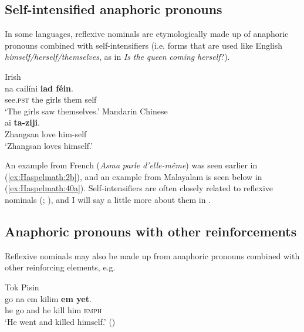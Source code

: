 \documentclass[output=paper]{langscibook}
\begin{document}
\subsection{Self-intensified anaphoric pronouns}\label{sec:Haspelmath:6.3}

In some languages, reflexive nominals are etymologically made up of anaphoric pronouns combined with self-intensifiers (i.e. forms that are used like English \textit{himself/herself/themselves}, as in \textit{Is} \textit{the} \textit{queen} \textit{coming} \textit{herself}?).

\ea%
    \label{ex:Haspelmath:26}
    \ea  Irish\label{ex:Haspelmath:26a}\\
      {na}  {cailíni}  \textbf{{iad}  {féin}}.  \\
      see.\textsc{pst}  the  girls  them  self  \\
    \glt ‘The girls saw themselves.’ \citep[36]{Nolan2000}
    \ex Mandarin Chinese  \label{ex:Haspelmath:26b}\\
       {ai}  \textbf{{ta-ziji}}. \\
        Zhangsan  love  him-self \\
    \glt‘Zhangsan loves himself.’ \citep[98]{Tang1989}
    \z
\z 

An example from French (\textit{Asma} \textit{parle} \textit{d’elle-même}) was seen earlier in (\ref{ex:Haspelmath:2b}), and an example from Malayalam is seen below in (\ref{ex:Haspelmath:40a}). Self-intensifiers are often closely related to reflexive nominals (\citealt{KoenigSiemund1999}; \citealt{KoenigEtAl2005}), and I will say a little more about them in .


\subsection{Anaphoric pronouns with other reinforcements}\label{sec:Haspelmath:6.4}

Reflexive nominals may also be made up from anaphoric pronouns combined with other reinforcing elements, e.g.

\ea Tok Pisin  
    \label{ex:Haspelmath:27}\\
      {go}  {na}  {em}  {kilim}  \textbf{{em}  {yet}}.\\
      he  go  and  he  kill  him  \textsc{emph}  \\
    \glt  ‘He went and killed himself.’ (\citealt{SmithSiegel2013})
\z
\end{document}
